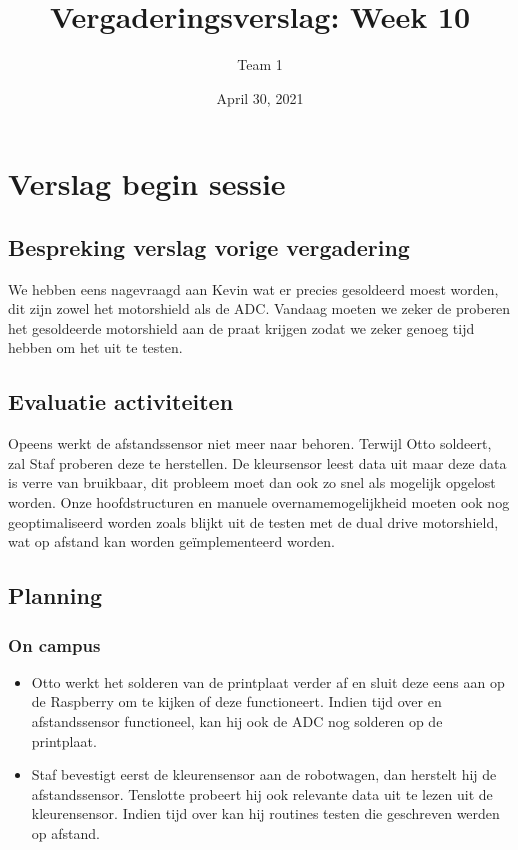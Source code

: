 \documentclass[a4paper,kulak]{kulakarticle} %
\date{April 30, 2021}
\title{Vergaderingsverslag: Week 10}
\author{Team 1}
\begin{document}
\maketitle

\section{Verslag begin sessie}

\subsection{Bespreking verslag vorige vergadering}
We hebben eens nagevraagd aan Kevin wat er precies gesoldeerd moest worden, dit zijn zowel het motorshield als de ADC. Vandaag moeten we zeker de proberen het gesoldeerde motorshield aan de praat krijgen zodat we zeker genoeg tijd hebben om het uit te testen.

\subsection{Evaluatie activiteiten}
Opeens werkt de afstandssensor niet meer naar behoren. Terwijl Otto soldeert, zal Staf proberen deze te herstellen. De kleursensor leest data uit maar deze data is verre van bruikbaar, dit probleem moet dan ook zo snel als mogelijk opgelost worden. Onze hoofdstructuren en manuele overnamemogelijkheid moeten ook nog geoptimaliseerd worden zoals blijkt uit de testen met de dual drive motorshield, wat op afstand kan worden geïmplementeerd worden. 

\subsection{Planning}
\subsubsection*{On campus}
\begin{itemize}
	\item Otto werkt het solderen van de printplaat verder af en sluit deze eens aan op de Raspberry om te kijken of deze functioneert. Indien tijd over en afstandssensor functioneel, kan hij ook de ADC nog solderen op de printplaat.
	\item Staf bevestigt eerst de kleurensensor aan de robotwagen, dan herstelt hij de afstandssensor. Tenslotte probeert hij ook relevante data uit te lezen uit de kleurensensor. Indien tijd over kan hij routines testen die geschreven werden op afstand.
\end{itemize}
\end{document}
